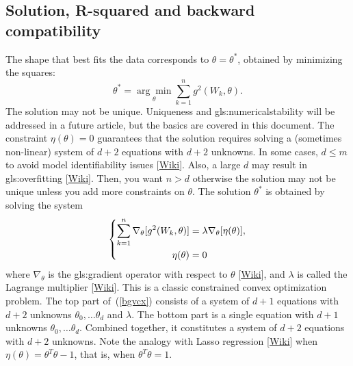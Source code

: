\documentclass[oneside,10pt]{book}
\begin{document}
\subsection{Solution, R-squared and backward compatibility}

The shape that best fits the data corresponds to $\theta=\theta^*$, obtained by minimizing the squares:
\begin{equation}
\theta^* = \underset{\theta}{\arg\min} \sum_{k=1}^n g^2(W_k,\theta).\label{tyrefd}
\end{equation}
The solution may not be unique. Uniqueness and \gls{gls:numericalstability} will be addressed in a future article, but the basics are covered in this document. The constraint $\eta(\theta)=0$ guarantees that the solution requires solving a (sometimes non-linear) 
 system of $d+2$ equations with $d+2$  unknowns. In some cases, $d\leq m$ to avoid \textcolor{index}{model identifiability} issues
 [\href{https://en.wikipedia.org/wiki/Identifiability}{Wiki}]. Also, a large $d$ may result in \gls{gls:overfitting} 
 [\href{https://en.wikipedia.org/wiki/Overfitting}{Wiki}].  Then, you want $n > d$ otherwise the solution may  not be unique unless you add more 
 constraints on $\theta$. The solution $\theta^*$ is obtained by solving the system
\begin{equation}
\centering
\left\{\begin{split}
 \sum_{k=1}^n \nabla_\theta [g^2(W_k,\theta)] & =\lambda \nabla_\theta [\eta(\theta)],\\
 \eta(\theta) & =0 \\
\end{split}\right. \label{bgvcx}
\end{equation}
where $\nabla_\theta$ is the \gls{gls:gradient} operator with respect to $\theta$ [\href{https://en.wikipedia.org/wiki/Gradient}{Wiki}], and $\lambda$ is called the \textcolor{index}{Lagrange multiplier} [\href{https://en.wikipedia.org/wiki/Lagrange_multiplier}{Wiki}]. This is a classic constrained convex optimization problem. The top part of~(\ref{bgvcx}) consists of a system of $d+1$ equations with $d+2$ unknowns 
  $\theta_0,\dots\theta_d$ and $\lambda$. The bottom part is a single equation with $d+1$ unknowns  $\theta_0,\dots\theta_d$. Combined together,
 it constitutes a system of $d+2$ equations with $d+2$ unknowns. Note the analogy with \textcolor{index}{Lasso regression} 
 [\href{https://en.wikipedia.org/wiki/Lasso_(statistics)}{Wiki}] when $\eta(\theta)=\theta^T\theta - 1$, that is, when $\theta^T\theta=1$. 
\end{document}
